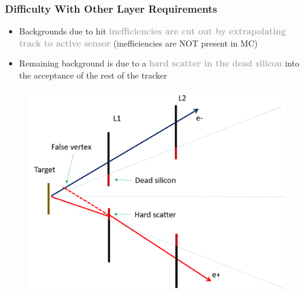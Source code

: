 \documentclass{beamer}
\begin{document}
\begin{frame}
\frametitle{Difficulty With Other Layer Requirements}
\begin{itemize}
\item Backgrounds due to hit \textcolor{darkgray}{\textbf{inefficiencies are cut out by extrapolating track to active sensor}} (inefficiencies are NOT present in MC)
\item Remaining background is due to a \textcolor{darkgray}{\textbf{hard scatter in the dead silicon}} into the acceptance of the rest of the tracker%
\end{itemize}
\begin{figure}
\includegraphics[width=0.55\linewidth]{figs/Scattering_schematic.png}
\end{figure}

\end{frame}

\end{document}
